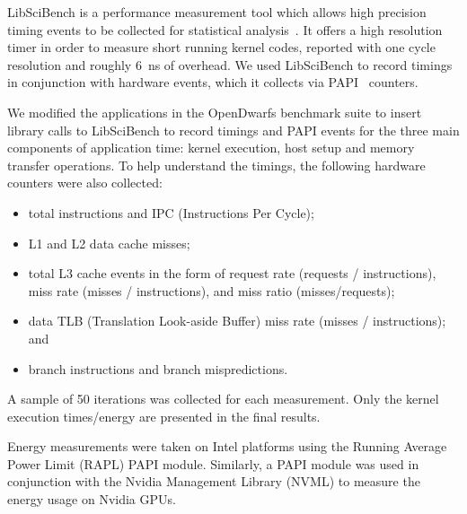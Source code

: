 \documentclass[../document.tex]{subfiles}
\begin{document}
\label{ssec:measurements}

LibSciBench is a performance measurement tool which allows high precision timing events to be collected for statistical analysis~\cite{hoefler2015scientific}.
It offers a high resolution timer in order to measure short running kernel codes, reported with one cycle resolution and roughly \SI{6}{\nano\second} of overhead.
We used LibSciBench to record timings in conjunction with hardware events, which it collects via PAPI~\cite{mucci1999papi} counters.

We modified the applications in the OpenDwarfs benchmark suite to insert library calls to LibSciBench to record timings and PAPI events for the three main components of application time: kernel execution, host setup and memory transfer operations.
To help understand the timings, the following hardware counters were also collected:
\begin{itemize}
	\item total instructions and IPC (Instructions Per Cycle);
	\item L1 and L2 data cache misses;
	\item total L3 cache events in the form of request rate (requests / instructions), miss rate (misses / instructions), and miss ratio (misses/requests);
	\item data TLB (Translation Look-aside Buffer) miss rate (misses / instructions); and
	\item branch instructions and branch mispredictions.
\end{itemize}

A sample of 50 iterations was collected for each measurement.
Only the kernel execution times/energy are presented in the final results.

Energy measurements were taken on Intel platforms using the Running Average Power Limit (RAPL) PAPI module.
Similarly, a PAPI module was used in conjunction with the Nvidia Management Library (NVML) to measure the energy usage on Nvidia GPUs.
\end{document}
